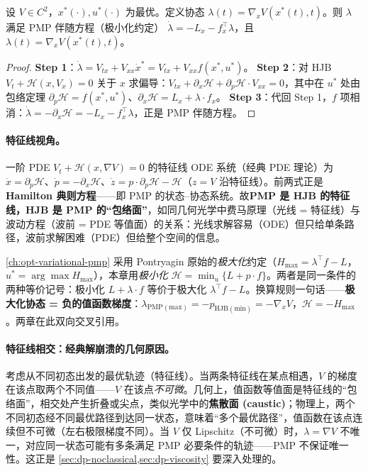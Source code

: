 \begin{theorem}\label{thm:dp-duality}
设 $V\in C^2$，$x^*(\cdot),u^*(\cdot)$ 为最优。定义协态 $\lambda(t)=\nabla_xV(x^*(t),t)$。则 $\lambda$ 满足 PMP 伴随方程（极小化约定） $\dot\lambda=-L_x-f_x^\top\lambda$，且 $\lambda(t)=\nabla_xV(x^*(t),t)$。
\end{theorem}

\begin{proof}
\textbf{Step 1}：$\dot\lambda=V_{tx}+V_{xx}\dot x^*=V_{tx}+V_{xx}f(x^*,u^*)$。
\textbf{Step 2}：对 HJB $V_t+\mathcal H(x,V_x)=0$ 关于 $x$ 求偏导：$V_{tx}+\partial_x\mathcal H+\partial_p\mathcal H\cdot V_{xx}=0$，其中在 $u^*$ 处由包络定理 $\partial_p\mathcal H=f(x^*,u^*)$、$\partial_x\mathcal H=L_x+\lambda\cdot f_x$。
\textbf{Step 3}：代回 Step 1，$f$ 项相消：$\dot\lambda=-\partial_x\mathcal H=-L_x-f_x^\top\lambda$，正是 PMP 伴随方程。
\end{proof}

\paragraph{特征线视角。}一阶 PDE $V_t+\mathcal H(x,\nabla V)=0$ 的特征线 ODE 系统（经典 PDE 理论）为 $\dot x=\partial_p\mathcal H$、$\dot p=-\partial_x\mathcal H$、$\dot z=p\cdot\partial_p\mathcal H-\mathcal H$（$z=V$ 沿特征线）。前两式正是 \textbf{Hamilton 典则方程}——即 PMP 的状态--协态系统。故\textbf{PMP 是 HJB 的特征线，HJB 是 PMP 的“包络面”}，如同几何光学中费马原理（光线 = 特征线）与波动方程（波前 = PDE 等值面）的关系：光线求解容易（ODE）但只给单条路径，波前求解困难（PDE）但给整个空间的信息。

\begin{remark}
\cref{ch:opt-variational-pmp} 采用 Pontryagin 原始的\emph{极大化}约定（$H_{\max}=\lambda^\top f-L$，$u^*=\arg\max H_{\max}$），本章用\emph{极小化} $\mathcal H=\min_u\{L+p\cdot f\}$。两者是同一条件的两种等价记号：极小化 $L+\lambda\cdot f$ 等价于极大化 $\lambda^\top f-L$。换算规则一句话——\textbf{极大化协态 = 负的值函数梯度}：$\lambda_{\mathrm{PMP(max)}}=-p_{\mathrm{HJB(min)}}=-\nabla_xV$，$\mathcal H=-H_{\max}$。两章在此双向交叉引用。
\end{remark}

\paragraph{特征线相交：经典解崩溃的几何原因。}考虑从不同初态出发的最优轨迹（特征线）。当两条特征线在某点相遇，$V$ 的梯度在该点取两个不同值——$V$ 在该点\emph{不可微}。几何上，值函数等值面是特征线的“包络面”，相交处产生折叠或尖点，类似光学中的\textbf{焦散面 (caustic)}；物理上，两个不同初态经不同最优路径到达同一状态，意味着“多个最优路径”，值函数在该点连续但不可微（左右极限梯度不同）。当 $V$ 仅 Lipschitz（不可微）时，$\lambda=\nabla V$ 不唯一，对应同一状态可能有多条满足 PMP 必要条件的轨迹——PMP 不保证唯一性。这正是 \cref{sec:dp-noclassical,sec:dp-viscosity} 要深入处理的。

